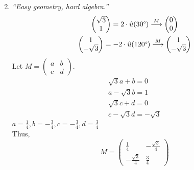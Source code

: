 \documentclass[12pt]{article}
\begin{document}
\begin{enumerate}[label=(\alph*)]
\begin{equation*}
{		}
	\end{equation*}
	\item \textit{``Easy geometry, hard algebra.''}
	\begin{gather*}
		\begin{pmatrix} \sqrt{3} \\ 1 \end{pmatrix}
		=
		2 \cdot \hat u(30 \degree)
		\overset{M}{\longrightarrow}
		\begin{pmatrix} 0 \\ 0 \end{pmatrix}
		\\
		\begin{pmatrix} 1 \\ -\sqrt{3} \end{pmatrix}
		=
		-2 \cdot \hat u(120 \degree)
		\overset{M}{\longrightarrow}
		\begin{pmatrix} 1 \\ -\sqrt{3} \end{pmatrix}
	\end{gather*}
	\newpage
	Let $M = \begin{pmatrix} a & b \\ c & d \end{pmatrix}$.
	\begin{gather*}
		\sqrt{3}a + b = 0 \\
		a - \sqrt{3}b = 1 \\
		\sqrt{3}c + d = 0 \\
		c - \sqrt{3}d = -\sqrt{3}
	\end{gather*}
	$a = \frac{1}{4}, b = -\frac{3}{4}, c = -\frac{3}{4}, d = \frac{3}{4}$
	\\[\baselineskip]
	Thus,
	\begin{equation*}
		M =
		\boxed{
			\begin{pmatrix}
				\frac{1}{4} & -\frac{\sqrt{3}}{4} \\
				-\frac{\sqrt{3}}{4} & \frac{3}{4}
			\end{pmatrix}
		}
	\end{equation*}
\end{enumerate}
\end{document}
